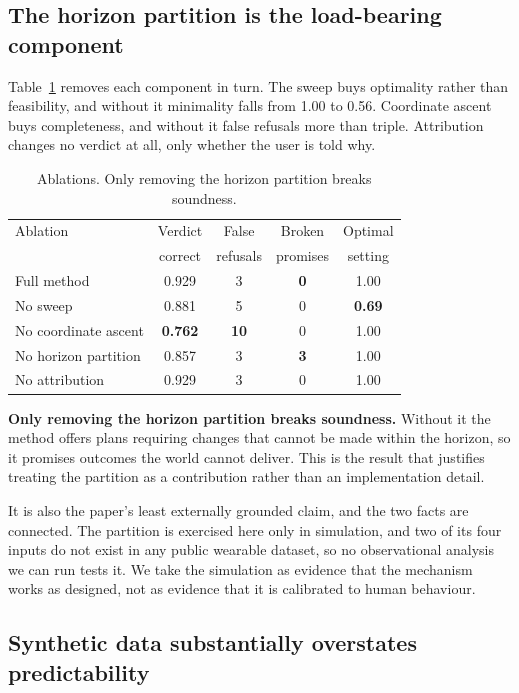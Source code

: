 \documentclass[conference,letterpaper]{IEEEtran}
\begin{document}
\subsection{The horizon partition is the load-bearing component}
\label{sec:ablation}

Table~\ref{tab:ablation} removes each component in turn. The sweep buys
optimality rather than feasibility, and without it minimality falls from 1.00 to
0.56. Coordinate ascent buys completeness, and without it false refusals more
than triple. Attribution changes no verdict at all, only whether the user is
told why.

\begin{table}[t]
\caption{Ablations. Only removing the horizon partition breaks soundness.}
\label{tab:ablation}
\centering
\small
\begin{tabular}{lcccc}
\toprule
Ablation & Verdict & False & Broken & Optimal \\
 & correct & refusals & promises & setting \\
\midrule
Full method & 0.929 & 3 & \textbf{0} & 1.00 \\
No sweep & 0.881 & 5 & 0 & \textbf{0.69} \\
No coordinate ascent & \textbf{0.762} & \textbf{10} & 0 & 1.00 \\
No horizon partition & 0.857 & 3 & \textbf{3} & 1.00 \\
No attribution & 0.929 & 3 & 0 & 1.00 \\
\bottomrule
\end{tabular}
\end{table}

\textbf{Only removing the horizon partition breaks soundness.} Without it the
method offers plans requiring changes that cannot be made within the horizon, so
it promises outcomes the world cannot deliver. This is the result that justifies
treating the partition as a contribution rather than an implementation detail.

It is also the paper's least externally grounded claim, and the two facts are
connected. The partition is exercised here only in simulation, and two of its
four inputs do not exist in any public wearable dataset, so no observational
analysis we can run tests it. We take the simulation as evidence that the
mechanism works as designed, not as evidence that it is calibrated to human
behaviour.

\subsection{Synthetic data substantially overstates predictability}
\end{document}

